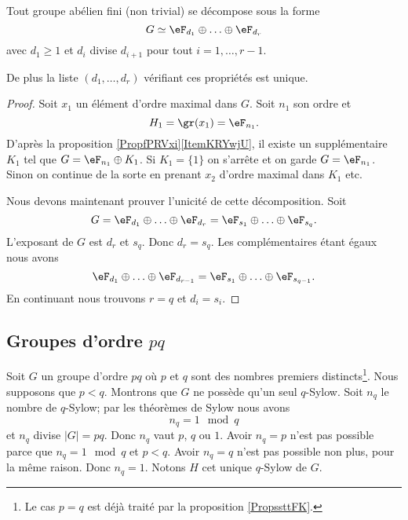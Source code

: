 \begin{theorem}
    Tout groupe abélien fini (non trivial) se décompose sous la forme
    \begin{equation}
        G\simeq \eF_{d_1}\oplus\ldots\oplus \eF_{d_r}
    \end{equation}
    avec \( d_1\geq 1\) et \( d_i\) divise \( d_{i+1}\) pour tout \( i=1,\ldots, r-1\).

    De plus la liste \( (d_1,\ldots, d_r)\) vérifiant ces propriétés est unique.
\end{theorem}

\begin{proof}
    Soit \( x_1\) un élément d'ordre maximal dans \( G\). Soit \( n_1\) son ordre et
    \begin{equation}
        H_1=\gr(x_1)=\eF_{n_1}.
    \end{equation}
    D'après la proposition \ref{PropfPRVxi}\ref{ItemKRYwjU}, il existe un supplémentaire \( K_1\) tel que \( G=\eF_{n_1}\oplus K_1\). Si \( K_1=\{ 1 \}\) on s'arrête et on garde \( G=\eF_{n_1}\). Sinon on continue de la sorte en prenant \( x_2\) d'ordre maximal dans \( K_1\) etc.

    Nous devons maintenant prouver l'unicité de cette décomposition. Soit
    \begin{equation}
        G=\eF_{d_1}\oplus\ldots\oplus \eF_{d_r}=\eF_{s_1}\oplus\ldots\oplus \eF_{s_q}.
    \end{equation}
    L'exposant de \( G\) est \( d_r\) et \( s_q\). Donc \( d_r=s_q\). Les complémentaires étant égaux nous avons
    \begin{equation}
        \eF_{d_1}\oplus\ldots\oplus \eF_{d_{r-1}}=\eF_{s_1}\oplus\ldots\oplus \eF_{s_{q-1}}.
    \end{equation}
    En continuant nous trouvons \( r=q\) et \( d_i=s_i\).
\end{proof}
 
\subsection{Groupes d'ordre $pq$}

Soit \( G\) un groupe d'ordre \( pq\) où \( p\) et \( q\) sont des nombres premiers distincts\footnote{Le cas \( p=q\) est déjà traité par la proposition \ref{PropssttFK}.}. Nous supposons que \( p<q\). Montrons que \( G\) ne possède qu'un seul \( q\)-Sylow. Soit \( n_q\) le nombre de \( q\)-Sylow; par les théorèmes de Sylow nous avons
\begin{equation}
    n_q=1\mod q
\end{equation}
et \( n_q\) divise \( | G |=pq\). Donc \( n_q\) vaut \( p\), \( q\) ou \( 1\). Avoir \( n_q=p\) n'est pas possible parce que \( n_q=1\mod q\) et \( p<q\). Avoir \( n_q=q\) n'est pas possible non plus, pour la même raison. Donc \( n_q=1\). Notons \( H\) cet unique \( q\)-Sylow de \( G\).

